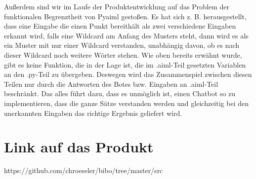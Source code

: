\documentclass[12pt,a4paper]{scrartcl}
\begin{document}
\begin{itemize}
Außerdem sind wir im Laufe der Produktentwicklung auf das Problem der funktionalen Begrenztheit von Pyaiml gestoßen. Es hat sich z. B. herausgestellt, dass eine Eingabe die einen Punkt bereithält als zwei verschiedene Eingaben erkannt wird, falls eine Wildcard am Anfang des Musters steht, dann wird es als ein Muster mit nur einer Wildcard verstanden, unabhängig davon, ob es nach dieser Wildcard noch weitere Wörter stehen. Wie oben bereits erwähnt wurde, gibt es keine Funktion, die in der Lage ist, die im .aiml-Teil gesetzten Variablen an den .py-Teil zu übergeben. Deswegen wird das Zusammenspiel zwischen diesen Teilen nur durch die Antworten des Botes bzw. Eingaben an .aiml-Teil beschränkt. Das alles führt dazu, dass es unmöglich ist, einen Chatbot so zu implementieren, dass die ganze Sätze verstanden werden und gleichzeitig bei den unerkannten Eingaben das richtige Ergebnis geliefert wird.
\end{itemize}
\section{Link auf das Produkt}
https://github.com/chroeseler/bibo/tree/master/src
\end{document}
